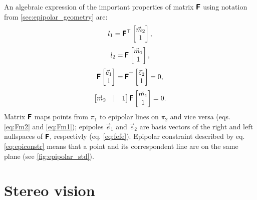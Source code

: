 An algebraic expression of the important properties of matrix $\pmb{\mathsf{F}}$ using notation from \autoref{sec:epipolar_geometry} are:
\begin{equation}
    \label{eq:Fm2}
    l_1 = \pmb{\mathsf{F}}^\top \begin{bmatrix} \vec{m}_2 \\ 1 \end{bmatrix},
\end{equation}
\begin{equation}
    \label{eq:Fm1}
    l_2 = \pmb{\mathsf{F}} \begin{bmatrix} \vec{m}_1 \\ 1 \end{bmatrix},
\end{equation}
\begin{equation}
    \label{eq:fefe}
    \pmb{\mathsf{F}} \begin{bmatrix} \vec{e}_1 \\ 1 \end{bmatrix} = \pmb{\mathsf{F}}^\top \begin{bmatrix} \vec{e}_2 \\ 1 \end{bmatrix} = 0,
\end{equation}
\begin{equation}
    \label{eq:epiconstr}
    \begin{bmatrix} \vec{m}_2 & | & 1 \end{bmatrix} \pmb{\mathsf{F}} \begin{bmatrix} \vec{m}_1 \\ 1 \end{bmatrix} = 0.
\end{equation}
Matrix $\pmb{\mathsf{F}}$ maps points from $\pi_1$ to epipolar lines on $\pi_2$ and vice versa (eqs. \eqref{eq:Fm2} and \eqref{eq:Fm1}); epipoles $\vec{e}_1$ and $\vec{e}_2$ are basis vectors of the right and left nullspaces of $\pmb{\mathsf{F}}$, respectivly (eq. \eqref{eq:fefe}).
Epipolar constraint described by eq. \eqref{eq:epiconstr} means that a point and its correspondent line are on the same plane (see \autoref{fig:epipolar_std}).

\section{Stereo vision}

